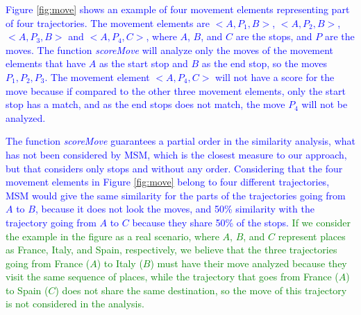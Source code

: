 \documentclass[12pt]{article}
\begin{document}
\textcolor{blue}{Figure \ref{fig:move} shows an example of four movement elements representing part of four trajectories. The movement elements are $<A, P_1, B>$, $<A, P_2, B>$, $<A, P_3, B>$ and $<A, P_4, C>$, where $A$, $B$, and $C$ are the stops, and $P$ are the moves. The function \emph{scoreMove} will analyze only the moves of the movement elements that have $A$ as the start stop and $B$ as the end stop, so the moves $P_1, P_2, P_3$. 
The movement element $<A, P_4, C>$ will not have a score for the move because if compared to the other three movement elements, only the start stop has a match, and as the end stops does not match, the move $P_4$ will not be analyzed.}



\textcolor{blue}{The function \emph{scoreMove} guarantees a partial order in the similarity analysis, what has not been considered by MSM, which is the closest measure to our approach, but that considers only stops and without any order. Considering that the four movement elements in Figure \ref{fig:move} belong to four different trajectories, MSM would give the same similarity for the parts of the trajectories going from $A$ to $B$, because it does not look the moves, and 50\% similarity with the trajectory going from $A$ to $C$ because they share 50\% of the stops.
}\textcolor{green}{If we consider the example in the figure as a real scenario, where $A$, $B$, and $C$ represent  places as France, Italy, and Spain, respectively, we believe that the three trajectories going from France ($A$) to Italy ($B$) must have their move analyzed because they visit the same sequence of places, while the trajectory that goes from France ($A$) to Spain ($C$) does not share the same destination, so the move of this trajectory is not considered in the analysis.}
\end{document}
